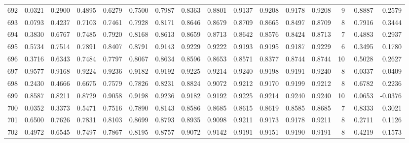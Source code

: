 \begin{tabular}{lrrrrrrrrrrrrrrr}
692 &      0.0321 &  0.2900 &  0.4895 &  0.6279 &  0.7500 &  0.7987 &  0.8363 &  0.8801 &  0.9137 &  0.9208 &   0.9178 &     0.9208 &      9 &                    0.8887 &                     0.2579 \\
693 &      0.0793 &  0.4237 &  0.7103 &  0.7461 &  0.7928 &  0.8171 &  0.8646 &  0.8679 &  0.8709 &  0.8665 &   0.8497 &     0.8709 &      8 &                    0.7916 &                     0.3444 \\
694 &      0.3830 &  0.6767 &  0.7485 &  0.7920 &  0.8168 &  0.8613 &  0.8659 &  0.8713 &  0.8642 &  0.8576 &   0.8424 &     0.8713 &      7 &                    0.4883 &                     0.2937 \\
695 &      0.5734 &  0.7514 &  0.7891 &  0.8407 &  0.8791 &  0.9143 &  0.9229 &  0.9222 &  0.9193 &  0.9195 &   0.9187 &     0.9229 &      6 &                    0.3495 &                     0.1780 \\
696 &      0.3716 &  0.6343 &  0.7484 &  0.7797 &  0.8067 &  0.8634 &  0.8596 &  0.8653 &  0.8571 &  0.8377 &   0.8744 &     0.8744 &     10 &                    0.5028 &                     0.2627 \\
697 &      0.9577 &  0.9168 &  0.9224 &  0.9236 &  0.9182 &  0.9192 &  0.9225 &  0.9214 &  0.9240 &  0.9198 &   0.9191 &     0.9240 &      8 &                   -0.0337 &                    -0.0409 \\
698 &      0.2430 &  0.4666 &  0.6675 &  0.7579 &  0.7826 &  0.8231 &  0.8824 &  0.9072 &  0.9212 &  0.9170 &   0.9199 &     0.9212 &      8 &                    0.6782 &                     0.2236 \\
699 &      0.8587 &  0.8211 &  0.8729 &  0.9058 &  0.9198 &  0.9236 &  0.9182 &  0.9192 &  0.9225 &  0.9214 &   0.9240 &     0.9240 &     10 &                    0.0653 &                    -0.0376 \\
700 &      0.0352 &  0.3373 &  0.5471 &  0.7516 &  0.7890 &  0.8143 &  0.8586 &  0.8685 &  0.8615 &  0.8619 &   0.8585 &     0.8685 &      7 &                    0.8333 &                     0.3021 \\
701 &      0.6500 &  0.7626 &  0.7831 &  0.8103 &  0.8699 &  0.8793 &  0.8935 &  0.9098 &  0.9211 &  0.9173 &   0.9178 &     0.9211 &      8 &                    0.2711 &                     0.1126 \\
702 &      0.4972 &  0.6545 &  0.7497 &  0.7867 &  0.8195 &  0.8757 &  0.9072 &  0.9142 &  0.9191 &  0.9151 &   0.9190 &     0.9191 &      8 &                    0.4219 &                     0.1573 \\

\end{tabular}
